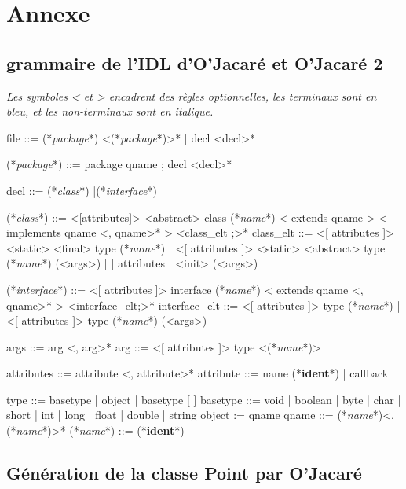 \documentclass[a4paper, 11pt]{article}
\newcommand{\class}{\ttfamily\textit{class}}
\newcommand{\interface}{\ttfamily\textit{interface}}
\newcommand{\name}{\ttfamily\textit{name}}
\newcommand{\package}{\ttfamily\textit{package}}
\newcommand{\ident}{\footnotesize\textbf{ident}}
\begin{document}


\newpage
\section{Annexe}


\subsection{grammaire de l'IDL d'O'Jacaré et O'Jacaré 2}\label{5.1}

\emph{Les symboles < et > encadrent des règles optionnelles,
les terminaux sont en bleu, et les non-terminaux sont en italique.}

\begin{idl}
file ::= (*\package*) <(*\package*)>*
  	| decl <decl>*
 
(*\package*) ::= package qname ; decl <decl>*

decl ::= (*\class*)
  	|(*\interface*)
 
(*\class*) ::= <[attributes]> <abstract> class (*\name*)
  	  < extends qname >
  	  < implements qname <, qname>* >
  	  { <class_elt ;>* }
class_elt ::= <[ attributes ]> <static> <final> type (*\name*)
            | <[ attributes ]> <static> <abstract> type (*\name*) (<args>)
            | [ attributes ] <init> (<args>)
 
(*\interface*) ::= <[ attributes ]> interface (*\name*)
  	       < extends qname <, qname>* >
  	      { <interface_elt;>* }
interface_elt ::= 
     <[ attributes ]> type (*\name*)
   | <[ attributes ]> type (*\name*) (<args>)
 
args ::= arg <, arg>*
arg ::= <[ attributes ]> type <(*\name*)>
 
attributes ::= 	attribute <, attribute>*
attribute ::= name (*\ident*)
  	    | callback
 
type ::= basetype
       | object
       | basetype [ ]
basetype ::= void
           | boolean
           | byte
           | char
           | short
           | int
           | long
           | float
           | double
           | string
object := qname
qname ::= (*\name*)<.(*\name*)>*
(*\name*) ::= (*\ident*)
\end{idl}

\newpage
\subsection{Génération de la classe Point par O'Jacaré}
\end{document}
